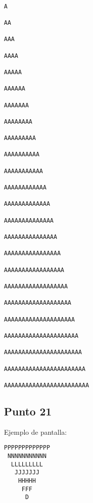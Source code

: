 \begin{lstlisting}
                                                                                A
                                                                               AA
                                                                              AAA
                                                                             AAAA
                                                                            AAAAA
                                                                           AAAAAA
                                                                          AAAAAAA
                                                                         AAAAAAAA
                                                                        AAAAAAAAA
                                                                       AAAAAAAAAA
                                                                      AAAAAAAAAAA
                                                                     AAAAAAAAAAAA
                                                                    AAAAAAAAAAAAA
                                                                   AAAAAAAAAAAAAA
                                                                  AAAAAAAAAAAAAAA
                                                                 AAAAAAAAAAAAAAAA
                                                                AAAAAAAAAAAAAAAAA
                                                               AAAAAAAAAAAAAAAAAA
                                                              AAAAAAAAAAAAAAAAAAA
                                                             AAAAAAAAAAAAAAAAAAAA
                                                            AAAAAAAAAAAAAAAAAAAAA
                                                           AAAAAAAAAAAAAAAAAAAAAA
                                                          AAAAAAAAAAAAAAAAAAAAAAA
                                                         AAAAAAAAAAAAAAAAAAAAAAAA
\end{lstlisting}





\subsection{Punto 21}
	
	Ejemplo de pantalla:
\begin{lstlisting}
PPPPPPPPPPPPP
 NNNNNNNNNNN
  LLLLLLLLL
   JJJJJJJ
    HHHHH
     FFF
      D
\end{lstlisting}

